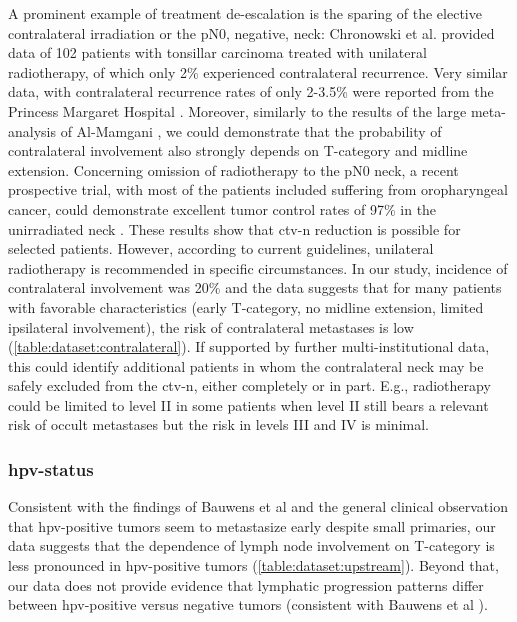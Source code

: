 \documentclass[\relativeRoot/main.tex]{subfiles}
\begin{document}
A prominent example of treatment de-escalation is the sparing of the elective contralateral irradiation or the pN0, negative, neck: Chronowski et al. \cite{chronowski_unilateral_2012} provided data of 102 patients with tonsillar carcinoma treated with unilateral radiotherapy, of which only 2\% experienced contralateral recurrence. Very similar data, with contralateral recurrence rates of only 2-3.5\% were reported from the Princess Margaret Hospital \cite{huang_re-evaluation_2017,osullivan_benefits_2001}. Moreover, similarly to the results of the large meta-analysis of Al-Mamgani \cite{al-mamgani_contralateral_2017}, we could demonstrate that the probability of contralateral involvement also strongly depends on T-category and midline extension. Concerning omission of radiotherapy to the pN0 neck, a recent prospective trial, with most of the patients included suffering from oropharyngeal cancer, could demonstrate excellent tumor control rates of 97\% in the unirradiated neck \cite{contreras_eliminating_2019}. These results show that \gls{ctv-n} reduction is possible for selected patients. However, according to current guidelines, unilateral radiotherapy is recommended in specific circumstances. In our study, incidence of contralateral involvement was 20\% and the data suggests that for many patients with favorable characteristics (early T-category, no midline extension, limited ipsilateral involvement), the risk of contralateral metastases is low (\cref{table:dataset:contralateral}). If supported by further multi-institutional data, this could identify additional patients in whom the contralateral neck may be safely excluded from the \gls{ctv-n}, either completely or in part. E.g., radiotherapy could be limited to level II in some patients when level II still bears a relevant risk of occult metastases but the risk in levels III and IV is minimal.

\subsubsection*{\Gls{hpv}-status}

Consistent with the findings of Bauwens et al \cite{bauwens_prevalence_2021} and the general clinical observation that \gls{hpv}-positive tumors seem to metastasize early despite small primaries, our data suggests that the dependence of lymph node involvement on T-category is less pronounced in \gls{hpv}-positive tumors (\cref{table:dataset:upstream}). Beyond that, our data does not provide evidence that lymphatic progression patterns differ between \gls{hpv}-positive versus negative tumors (consistent with Bauwens et al \cite{bauwens_prevalence_2021}).
\end{document}
